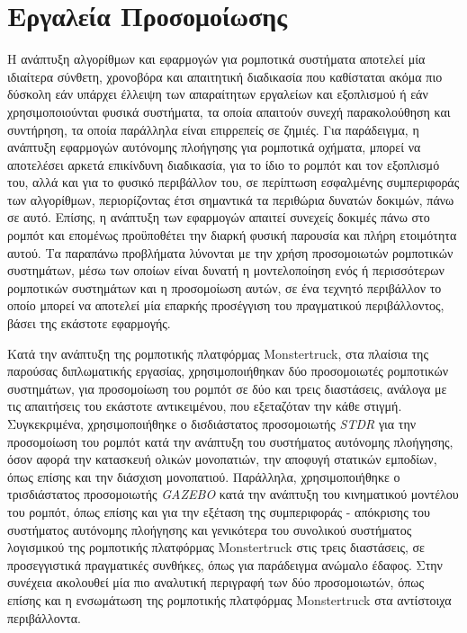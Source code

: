 \section{Εργαλεία Προσομοίωσης} \label{sec:simulation_tools}
Η ανάπτυξη αλγορίθμων και εφαρμογών για ρομποτικά συστήματα αποτελεί μία ιδιαίτερα σύνθετη, χρονοβόρα και απαιτητική διαδικασία που καθίσταται ακόμα πιο δύσκολη εάν υπάρχει έλλειψη των απαραίτητων εργαλείων και εξοπλισμού ή εάν χρησιμοποιούνται φυσικά συστήματα, τα οποία απαιτούν συνεχή παρακολούθηση και συντήρηση, τα οποία παράλληλα είναι επιρρεπείς σε ζημιές. Για παράδειγμα, η ανάπτυξη εφαρμογών αυτόνομης πλοήγησης για ρομποτικά οχήματα, μπορεί να αποτελέσει αρκετά επικίνδυνη διαδικασία, για το ίδιο το ρομπότ και τον εξοπλισμό του, αλλά και για το φυσικό περιβάλλον του, σε περίπτωση εσφαλμένης συμπεριφοράς των αλγορίθμων, περιορίζοντας έτσι σημαντικά τα περιθώρια δυνατών δοκιμών, πάνω σε αυτό. Επίσης, η ανάπτυξη των εφαρμογών απαιτεί συνεχείς δοκιμές πάνω στο ρομπότ και επομένως προϋποθέτει την διαρκή φυσική παρουσία και πλήρη ετοιμότητα αυτού. Τα παραπάνω προβλήματα λύνονται με την χρήση προσομοιωτών ρομποτικών συστημάτων, μέσω των οποίων είναι δυνατή η μοντελοποίηση ενός ή περισσότερων ρομποτικών συστημάτων και η προσομοίωση αυτών, σε ένα τεχνητό περιβάλλον το οποίο μπορεί να αποτελεί μία επαρκής προσέγγιση του πραγματικού περιβάλλοντος, βάσει της εκάστοτε εφαρμογής.

\bigskip
Κατά την ανάπτυξη της ρομποτικής πλατφόρμας Monstertruck, στα πλαίσια της παρούσας διπλωματικής εργασίας, χρησιμοποιήθηκαν δύο προσομοιωτές ρομποτικών συστημάτων, για προσομοίωση του ρομπότ σε δύο και τρεις διαστάσεις, ανάλογα με τις απαιτήσεις του εκάστοτε αντικειμένου, που εξεταζόταν την κάθε στιγμή. Συγκεκριμένα, χρησιμοποιήθηκε ο δισδιάστατος προσομοιωτής \textit{STDR} \cite{stdr} για την προσομοίωση του ρομπότ κατά την ανάπτυξη του συστήματος αυτόνομης πλοήγησης, όσον αφορά την κατασκευή ολικών μονοπατιών, την αποφυγή στατικών εμποδίων, όπως επίσης και την διάσχιση μονοπατιού. Παράλληλα, χρησιμοποιήθηκε ο τρισδιάστατος προσομοιωτής \textit{GAZEBO} \cite{gazebo} κατά την ανάπτυξη του κινηματικού μοντέλου του ρομπότ, όπως επίσης και για την εξέταση της συμπεριφοράς - απόκρισης του συστήματος αυτόνομης πλοήγησης και γενικότερα του συνολικού συστήματος λογισμικού της ρομποτικής πλατφόρμας Monstertruck στις τρεις διαστάσεις, σε προσεγγιστικά πραγματικές συνθήκες, όπως για παράδειγμα ανώμαλο έδαφος. Στην συνέχεια ακολουθεί μία πιο αναλυτική περιγραφή των δύο προσομοιωτών, όπως επίσης και η ενσωμάτωση της ρομποτικής πλατφόρμας Monstertruck στα αντίστοιχα περιβάλλοντα.

